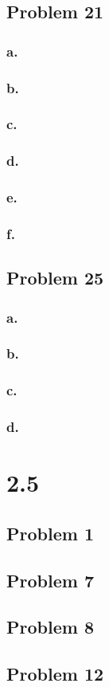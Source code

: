 \documentclass[11pt]{article}
\begin{document}
\subsection{Problem 21}
\subsubsection{a.}

\subsubsection{b.}

\subsubsection{c.}

\subsubsection{d.}

\subsubsection{e.}

\subsubsection{f.}

\subsection{Problem 25}
\subsubsection{a.}

\subsubsection{b.}

\subsubsection{c.}

\subsubsection{d.}

\section{2.5}
\subsection{Problem 1}

\subsection{Problem 7}

\subsection{Problem 8}

\subsection{Problem 12}
\end{document}
